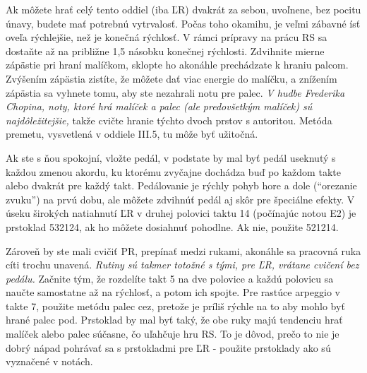 Ak môžete hrať celý tento oddiel (iba ĽR) dvakrát za sebou, uvoľnene, bez pocitu únavy, budete mať potrebnú vytrvalosť. Počas toho okamihu, je veľmi zábavné ísť oveľa rýchlejšie, než je konečná rýchlosť. V rámci prípravy na prácu RS sa dostaňte až na približne 1,5 násobku konečnej rýchlosti. Zdvihnite mierne zápästie pri hraní malíčkom, sklopte ho akonáhle prechádzate k hraniu palcom. Zvýšením zápästia zistíte, že môžete dať viac energie do malíčku, a znížením zápästia sa vyhnete tomu, aby ste nezahrali notu pre palec. \emph{V hudbe Frederika Chopina, noty, ktoré hrá malíček a palec (ale predovšetkým malíček) sú najdôležitejšie,} takže cvičte hranie týchto dvoch prstov s autoritou. Metóda premetu, vysvetlená v oddiele III.5, tu môže byť užitočná.

Ak ste s ňou spokojní, vložte pedál, v podstate by mal byť pedál useknutý s každou zmenou akordu, ku ktorému zvyčajne dochádza buď po každom takte alebo dvakrát pre každý takt. Pedálovanie je rýchly pohyb hore a dole (“orezanie zvuku”) na prvú dobu, ale môžete zdvihnúť pedál aj skôr pre špeciálne efekty. V úseku širokých natiahnutí ĽR v druhej polovici taktu 14 (počínajúc notou E2) je prstoklad 532124, ak ho môžete dosiahnuť pohodlne. Ak nie, použite 521214.

Zároveň by ste mali cvičiť PR, prepínať medzi rukami, akonáhle sa pracovná ruka cíti trochu unavená. \emph{Rutiny sú takmer totožné s tými, pre ĽR, vrátane cvičení bez pedálu.} Začnite tým, že rozdelíte takt 5 na dve polovice a každú polovicu sa naučte samostatne až na rýchlosť, a potom ich spojte. Pre rastúce arpeggio v takte 7, použite metódu palec cez, pretože je príliš rýchle na to aby mohlo byť hrané palec pod. Prstoklad by mal byť taký, že obe ruky majú tendenciu hrať malíček alebo palec súčasne, čo uľahčuje hru RS. To je dôvod, prečo to nie je dobrý nápad pohrávať sa s prstokladmi pre ĽR - použite prstoklady ako sú vyznačené v notách.

